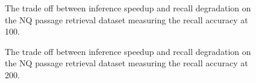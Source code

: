 \begin{figure}[!htb]
    \centering
    \caption{The trade off between inference speedup and recall degradation on the NQ passage retrieval dataset measuring the recall accuracy at 100. }
    \label{fig:KALE-NQ-Top100}
\end{figure}
\begin{figure}[!htb]
    \centering
    \caption{The trade off between inference speedup and recall degradation on the NQ passage retrieval dataset measuring the recall accuracy at 200. }
    \label{fig:KALE-NQ-Top200}
\end{figure}

